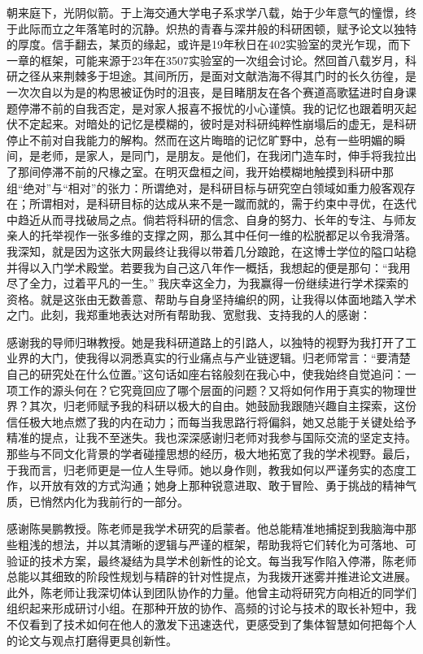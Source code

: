 
\begin{acknowledgements}
  朝来庭下，光阴似箭。于上海交通大学电子系求学八载，始于少年意气的憧憬，终于此际而立之年落笔时的沉静。炽热的青春与深井般的科研困顿，赋予论文以独特的厚度。信手翻去，某页的缘起，或许是19年秋日在402实验室的灵光乍现，而下一章的框架，可能来源于23年在3507实验室的一次组会讨论。然回首八载岁月，科研之径从来荆棘多于坦途。其间所历，是面对文献浩海不得其门时的长久彷徨，是一次次自以为是的构思被证伪时的沮丧，是目睹朋友在各个赛道高歌猛进时自身课题停滞不前的自我否定，是对家人报喜不报忧的小心谨慎。我的记忆也跟着明灭起伏不定起来。对暗处的记忆是模糊的，彼时是对科研纯粹性崩塌后的虚无，是科研停止不前对自我能力的解构。然而在这片晦暗的记忆旷野中，总有一些明媚的瞬间，是老师，是家人，是同门，是朋友。是他们，在我闭门造车时，伸手将我拉出了那间停滞不前的尺椽之室。在明灭盘桓之间，我开始模糊地触摸到科研中那组“绝对”与“相对”的张力：所谓绝对，是科研目标与研究空白领域如重力般客观存在；所谓相对，是科研目标的达成从来不是一蹴而就的，需于约束中寻优，在迭代中趋近从而寻找破局之点。倘若将科研的信念、自身的努力、长年的专注、与师友亲人的托举视作一张多维的支撑之网，那么其中任何一维的松脱都足以令我滑落。我深知，就是因为这张大网最终让我得以带着几分踉跄，在这博士学位的隘口站稳并得以入门学术殿堂。若要我为自己这八年作一概括，我想起的便是那句：“我用尽了全力，过着平凡的一生。” 我庆幸这全力，为我赢得一份继续进行学术探索的资格。就是这张由无数善意、帮助与自身坚持编织的网，让我得以体面地踏入学术之门。此刻，我郑重地表达对所有帮助我、宽慰我、支持我的人的感谢：

  感谢我的导师归琳教授。她是我科研道路上的引路人，以独特的视野为我打开了工业界的大门，使我得以洞悉真实的行业痛点与产业链逻辑。归老师常言：“要清楚自己的研究处在什么位置。”这句话如座右铭般刻在我心中，使我始终自觉追问：一项工作的源头何在？它究竟回应了哪个层面的问题？又将如何作用于真实的物理世界？其次，归老师赋予我的科研以极大的自由。她鼓励我跟随兴趣自主探索，这份信任极大地点燃了我的内在动力；而每当我思路行将偏斜，她又总能于关键处给予精准的提点，让我不至迷失。我也深深感谢归老师对我参与国际交流的坚定支持。那些与不同文化背景的学者碰撞思想的经历，极大地拓宽了我的学术视野。最后，于我而言，归老师更是一位人生导师。她以身作则，教我如何以严谨务实的态度工作，以开放有效的方式沟通；她身上那种锐意进取、敢于冒险、勇于挑战的精神气质，已悄然内化为我前行的一部分。

  感谢陈昊鹏教授。陈老师是我学术研究的启蒙者。他总能精准地捕捉到我脑海中那些粗浅的想法，并以其清晰的逻辑与严谨的框架，帮助我将它们转化为可落地、可验证的技术方案，最终凝结为具学术创新性的论文。每当我写作陷入停滞，陈老师总能以其细致的阶段性规划与精辟的针对性提点，为我拨开迷雾并推进论文进展。此外，陈老师让我深切体认到团队协作的力量。他曾主动将研究方向相近的同学们组织起来形成研讨小组。在那种开放的协作、高频的讨论与技术的取长补短中，我不仅看到了技术如何在他人的激发下迅速迭代，更感受到了集体智慧如何把每个人的论文与观点打磨得更具创新性。


\end{acknowledgements}
